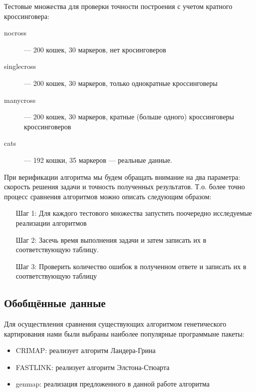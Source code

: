 \documentclass{matmex-diploma-custom}
\begin{document}
Тестовые множества для проверки точности построения с учетом кратного
кроссинговера:
\begin{description}
\item[nocross] --- 200 кошек, 30 маркеров, нет кросинговеров
\item[singlecross] --- 200 кошек, 30 маркеров, только однократные кроссинговеры
\item[manycross] --- 200 кошек, 30 маркеров, кратные (больше одного)
  кроссинговеры кроссинговеров
\item[cats] --- 192 кошки, 35 маркеров --- реальные данные.
\end{description}

При верификации алгоритма мы будем обращать внимание на два параметра:
скорость решения задачи и точность полученных результатов. Т.о. более
точно процесс сравнения алгоритмов можно описать следующим образом:

\begin{enumerate}
\item[Шаг 1:] Для каждого тестового множества запустить поочередно
  исследуемые реализации алгоритмов
\item[Шаг 2:] Засечь время выполнения задачи и затем записать их в
  соответствующую таблицу.
\item[Шаг 3:] Проверить количество ошибок в полученном ответе и
  записать их в соответствующую таблицу
\end{enumerate}

\subsection{Обобщённые данные}

Для осуществления сравнения существующих алгоритмом генетического
картирования нами были выбраны наиболее популярные программыне пакеты:

\begin{itemize}
\item CRIMAP: реализует алгоритм Ландера-Грина
\item FASTLINK: реализует алгоритм Элстона-Стюарта
\item genmap: реализация предложенного в данной работе алгоритма
\end{itemize}
\end{document}
